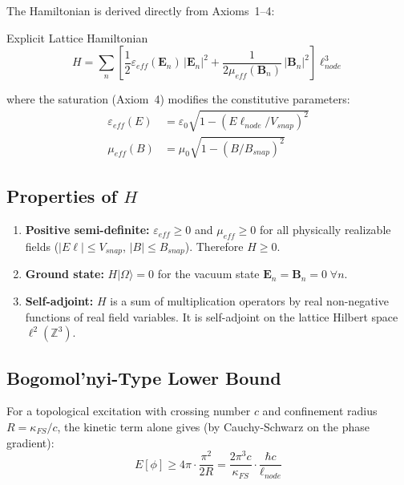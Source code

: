 The Hamiltonian is derived directly from Axioms~1--4:
\begin{resultbox}{Explicit Lattice Hamiltonian}
\begin{equation}
    H = \sum_{n} \left[
    \frac{1}{2}\varepsilon_{eff}(\mathbf{E}_n)\,|\mathbf{E}_n|^2
    + \frac{1}{2\mu_{eff}(\mathbf{B}_n)}\,|\mathbf{B}_n|^2
    \right] \ell_{node}^3
    \label{eq:lattice_hamiltonian}
\end{equation}
\end{resultbox}
where the saturation (Axiom~4) modifies the constitutive parameters:
\begin{align}
    \varepsilon_{eff}(E) &= \varepsilon_0
    \sqrt{1 - (E\ell_{node}/V_{snap})^2} \\
    \mu_{eff}(B) &= \mu_0 \sqrt{1 - (B/B_{snap})^2}
\end{align}

\subsection{Properties of $H$}

\begin{enumerate}
    \item \textbf{Positive semi-definite:}
    $\varepsilon_{eff} \ge 0$ and $\mu_{eff} \ge 0$ for all physically
    realizable fields ($|E\ell| \le V_{snap}$, $|B| \le B_{snap}$).
    Therefore $H \ge 0$.
    \item \textbf{Ground state:}
    $H|\Omega\rangle = 0$ for the vacuum state $\mathbf{E}_n =
    \mathbf{B}_n = 0 \;\forall n$.
    \item \textbf{Self-adjoint:}
    $H$ is a sum of multiplication operators by real non-negative
    functions of real field variables.  It is self-adjoint on the
    lattice Hilbert space $\ell^2(\mathbb{Z}^3)$.
\end{enumerate}

\subsection{Bogomol'nyi-Type Lower Bound}

For a topological excitation with crossing number $c$ and confinement
radius $R = \kappa_{FS}/c$, the kinetic term alone gives (by
Cauchy-Schwarz on the phase gradient):
\begin{equation}
    E[\phi] \ge 4\pi \cdot \frac{\pi^2}{2R}
    = \frac{2\pi^3 c}{\kappa_{FS}} \cdot \frac{\hbar c}{\ell_{node}}
    \label{eq:bogomolnyi_bound}
\end{equation}

